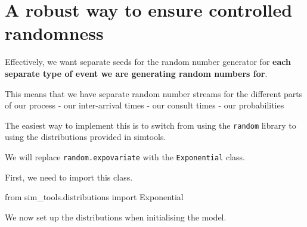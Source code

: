 \documentclass[
  letterpaper,
  DIV=11,
  numbers=noendperiod]{scrreprt}
\newenvironment{Shaded}{\begin{snugshade}}{\end{snugshade}}
\newcommand{\ImportTok}[1]{\textcolor[rgb]{0.00,0.46,0.62}{#1}}
\newcommand{\NormalTok}[1]{\textcolor[rgb]{0.00,0.23,0.31}{#1}}
\begin{document}
\section{A robust way to ensure controlled randomness}\label{sec-robust}

Effectively, we want separate seeds for the random number generator for
\textbf{each separate type of event we are generating random numbers
for}.

This means that we have separate random number streams for the different
parts of our process - our inter-arrival times - our consult times - our
probabilities

The easiest way to implement this is to switch from using the
\texttt{random} library to using the distributions provided in simtools.

We will replace \texttt{random.expovariate} with the
\texttt{Exponential} class.

First, we need to import this class.

\begin{Shaded}
\begin{Highlighting}[]
\ImportTok{from}\NormalTok{ sim\_tools.distributions }\ImportTok{import}\NormalTok{ Exponential}
\end{Highlighting}
\end{Shaded}

We now set up the distributions when initialising the model.
\end{document}
